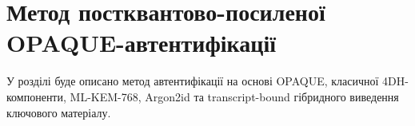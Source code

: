 \chapter{Метод постквантово-посиленої OPAQUE-автентифікації}

У розділі буде описано метод автентифікації на основі OPAQUE, класичної 4DH-компоненти, ML-KEM-768, Argon2id та transcript-bound гібридного виведення ключового матеріалу.

